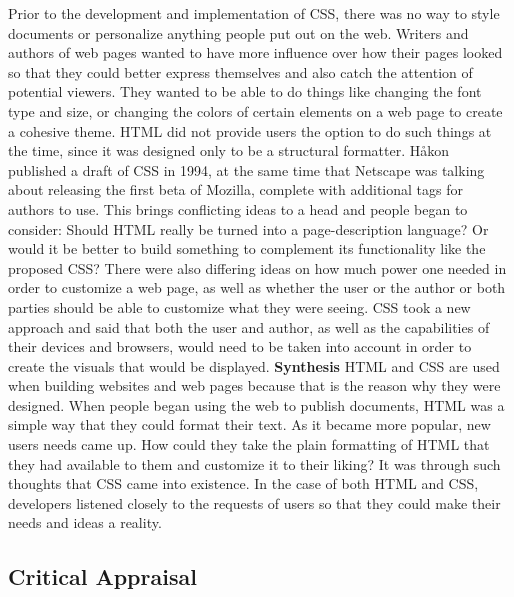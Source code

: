 \documentclass{article}
\theoremstyle{theorem}
\theoremstyle{definition}
\theoremstyle{remark}
\begin{document}
\newline\indent Prior to the development and implementation of CSS, there was no way to style documents or personalize anything people put out on the web. Writers and authors of web pages wanted to have more influence over how their pages looked so that they could better express themselves and also catch the attention of potential viewers. They wanted to be able to do things like changing the font type and size, or changing the colors of certain elements on a web page to create a cohesive theme. HTML did not provide users the option to do such things at the time, since it was designed only to be a structural formatter.
\newline\indent Håkon published a draft of CSS in 1994, at the same time that Netscape was talking about releasing the first beta of Mozilla, complete with additional tags for authors to use. This brings conflicting ideas to a head and people began to consider: Should HTML really be turned into a page-description language? Or would it be better to build something to complement its functionality like the proposed CSS? There were also differing ideas on how much power one needed in order to customize a web page, as well as whether the user or the author or both parties should be able to customize what they were seeing. CSS took a new approach and said that both the user and author, as well as the capabilities of their devices and browsers, would need to be taken into account in order to create the visuals that would be displayed.\newline\newline
\noindent\textbf{Synthesis}
\newline\indent HTML and CSS are used when building websites and web pages because that is the reason why they were designed. When people began using the web to publish documents, HTML was a simple way that they could format their text. As it became more popular, new users needs came up. How could they take the plain formatting of HTML that they had available to them and customize it to their liking? It was through such thoughts that CSS came into existence. In the case of both HTML and CSS, developers listened closely to the requests of users so that they could make their needs and ideas a reality.
\subsection{Critical Appraisal}
\end{document}
